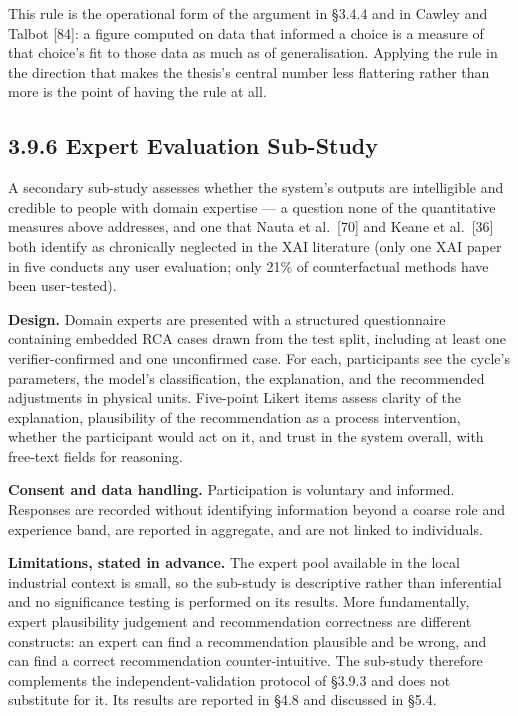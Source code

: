This rule is the operational form of the argument in §3.4.4 and in Cawley and Talbot {[}84{]}: a figure computed on data that informed a choice is a measure of that choice's fit to those data as much as of generalisation. Applying the rule in the direction that makes the thesis's central number less flattering rather than more is the point of having the rule at all.

\hypertarget{expert-evaluation-sub-study}{%
\subsection{3.9.6 Expert Evaluation Sub-Study}\label{expert-evaluation-sub-study}}

A secondary sub-study assesses whether the system's outputs are intelligible and credible to people with domain expertise --- a question none of the quantitative measures above addresses, and one that Nauta et al.~{[}70{]} and Keane et al.~{[}36{]} both identify as chronically neglected in the XAI literature (only one XAI paper in five conducts any user evaluation; only 21\% of counterfactual methods have been user-tested).

\textbf{Design.} Domain experts are presented with a structured questionnaire containing embedded RCA cases drawn from the test split, including at least one verifier-confirmed and one unconfirmed case. For each, participants see the cycle's parameters, the model's classification, the explanation, and the recommended adjustments in physical units. Five-point Likert items assess clarity of the explanation, plausibility of the recommendation as a process intervention, whether the participant would act on it, and trust in the system overall, with free-text fields for reasoning.

\textbf{Consent and data handling.} Participation is voluntary and informed. Responses are recorded without identifying information beyond a coarse role and experience band, are reported in aggregate, and are not linked to individuals.

\textbf{Limitations, stated in advance.} The expert pool available in the local industrial context is small, so the sub-study is descriptive rather than inferential and no significance testing is performed on its results. More fundamentally, expert plausibility judgement and recommendation correctness are different constructs: an expert can find a recommendation plausible and be wrong, and can find a correct recommendation counter-intuitive. The sub-study therefore complements the independent-validation protocol of §3.9.3 and does not substitute for it. Its results are reported in §4.8 and discussed in §5.4.

